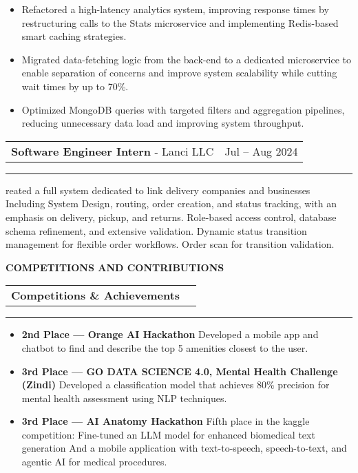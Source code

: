 \documentclass[10pt,a4paper]{article}
\newcommand{\cvsection}[1]{%
  \vspace{1em}%
  {\centering\textcolor{sectcol}{\textbf{#1}}\par}%
  \vspace{0.2em}%
}
\newcommand{\cveventh}[2]
{
\begin{tabular*}{1\textwidth}{p{13.6cm}  x{3.9cm}}
	\textbf{#1}
\end{tabular*}
\vspace{-8pt}
\textcolor{softcol}{\hrule}
\vspace{2pt}
    #2
}
\newcommand{\cveventt}[5]
{
\begin{tabular*}{1\textwidth}{p{13.6cm}  x{3.9cm}}
	\textbf{#2} - \textcolor{bgcol}{#3} &   \vspace{2.5pt}\textcolor{bgcol}{#1}
\end{tabular*}
\vspace{-8pt}
\textcolor{softcol}{\hrule}
\vspace{2pt}
    #4
}
\begin{document}
\vspace{-6px}

\begin{itemize}
\setlength{\itemsep}{-2pt} %
\item Refactored a high-latency analytics system, improving response times by restructuring calls to the Stats microservice and implementing Redis-based smart caching strategies.
\item Migrated data-fetching logic from the back-end to a dedicated microservice to enable separation of concerns and improve system scalability while cutting wait times by up to 70\%.
\item Optimized MongoDB queries with targeted filters and aggregation pipelines, reducing unnecessary data load and improving system throughput.
\end{itemize}

\cveventt{Jul – Aug 2024}{Software Engineer Intern}{Lanci LLC}{}

Created a full system dedicated to link delivery companies and businesses Including System Design, routing, order creation, and status tracking, with an emphasis on delivery, pickup, and returns. Role-based access control, database schema refinement, and extensive validation. Dynamic status transition management for flexible order workflows. Order scan for transition validation.

\vspace{-10px}
\cvsection{COMPETITIONS AND CONTRIBUTIONS}


\cveventh{Competitions \& Achievements}{
\begin{itemize}[noitemsep, topsep=-1pt, left=0pt]
    \item \textbf{2nd Place — Orange AI Hackathon} Developed a mobile app and chatbot to find and describe the top 5 amenities closest to the user.
    \item \textbf{3rd Place — GO DATA SCIENCE 4.0, Mental Health Challenge (Zindi)} Developed a classification model that achieves 80\% precision for mental health assessment using NLP techniques.
    \item \textbf{3rd Place — AI Anatomy Hackathon} Fifth place in the kaggle competition: Fine-tuned an LLM model for enhanced biomedical text generation 
And a mobile application with text-to-speech, speech-to-text, and agentic AI for medical procedures.
\end{itemize}
}
\end{document}
